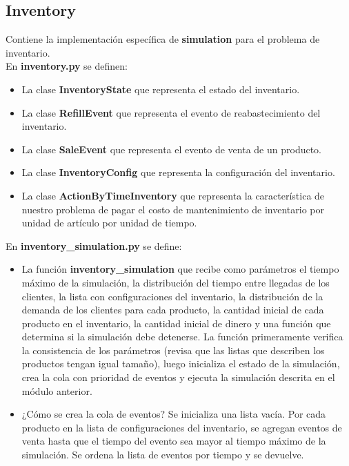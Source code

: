 \documentclass{article}
\begin{document}
\subsection*{Inventory}

Contiene la implementación específica de \textbf{simulation} para el problema de inventario.\\

En \textbf{inventory.py} se definen:

\begin{itemize}
    \item La clase \textbf{InventoryState} que representa el estado del inventario.
    \item La clase \textbf{RefillEvent} que representa el evento de reabastecimiento del inventario.
    \item La clase \textbf{SaleEvent} que representa el evento de venta de un producto.
    \item La clase \textbf{InventoryConfig} que representa la configuración del inventario.
    \item La clase \textbf{ActionByTimeInventory} que representa la característica de nuestro problema de pagar el costo de
  mantenimiento de inventario por unidad de artículo por unidad de tiempo.
\end{itemize}

En \textbf{inventory\_simulation.py} se define:

\begin{itemize}
    \item La función \textbf{inventory\_simulation} que recibe como parámetros el tiempo máximo de la simulación, la distribución del
  tiempo entre llegadas de los clientes, la lista con configuraciones del inventario, la distribución de la demanda de
  los clientes
  para cada producto, la cantidad inicial de cada producto en el inventario, la cantidad inicial de dinero y una función
  que determina si
  la simulación debe detenerse.
  La función primeramente verifica la consistencia de los parámetros (revisa que las listas que describen los productos
  tengan igual tamaño), luego inicializa el estado de la simulación, crea la cola con prioridad de eventos y ejecuta la
  simulación descrita en el módulo anterior.

    \item  ¿Cómo se crea la cola de eventos?
  Se inicializa una lista vacía.
  Por cada producto en la lista de configuraciones del inventario, se agregan eventos de venta hasta que el tiempo del
  evento sea mayor al tiempo máximo de la simulación.
  Se ordena la lista de eventos por tiempo y se devuelve.
\end{itemize}
\end{document}
